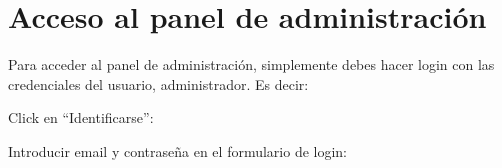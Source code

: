 \documentclass[12pt, spanish]{article}
\begin{document}
    \section{Acceso al panel de administración}

    Para acceder al panel de administración, simplemente debes hacer login con las credenciales
    del usuario, administrador. Es decir:

    \begin{steps}
        \item Click en ``Identificarse'':

            \medskip
            \begin{minipage}[t]{\linewidth}
            \raggedright
        \end{minipage}
        \item Introducir email y contraseña en el formulario de login:

            \medskip
            \begin{minipage}[t]{\linewidth}
            \raggedright
        \end{minipage}
    \end{steps}
\end{document}
